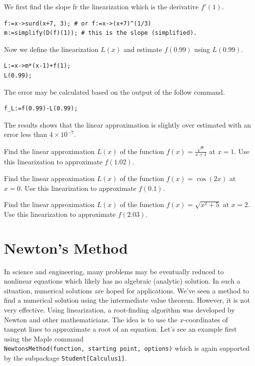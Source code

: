 \documentclass[]{book}
\theoremstyle{definition}
\theoremstyle{definition}
\theoremstyle{definition}
\theoremstyle{remark}
\let\BeginKnitrBlock\begin \let\EndKnitrBlock\end
\begin{document}
\BeginKnitrBlock{solution}
{}
We first find the slope fr the linearization which is the derivative \(f'(1)\).

\begin{verbatim}
f:=x->surd(x+7, 3); # or f:=x->(x+7)^(1/3)
m:=simplify(D(f)(1)); # this is the slope (simplified).
\end{verbatim}

Now we define the linearization \(L(x)\) and estimate \(f(0.99)\) using \(L(0.99)\).

\begin{verbatim}
L:=x->m*(x-1)+f(1);
L(0.99);
\end{verbatim}

The error may be calculated based on the output of the follow command.

\begin{verbatim}
f_L:=f(0.99)-L(0.99);
\end{verbatim}

The results shows that the linear approximation is slightly over estimated with an error less than \(4\times 10^{-7}\).
\EndKnitrBlock{solution}

\BeginKnitrBlock{exercise}
\protect\hypertarget{exr:unnamed-chunk-78}{}{\label{exr:unnamed-chunk-78} }
Find the linear approximation \(L(x)\) of the function \(f(x) = \frac{\sqrt{x}}{x+1}\) at \(x = 1\). Use this linearization to approximate \(f(1.02)\).
\EndKnitrBlock{exercise}

\BeginKnitrBlock{exercise}
\protect\hypertarget{exr:unnamed-chunk-79}{}{\label{exr:unnamed-chunk-79} }
Find the linear approximation \(L(x)\) of the function \(f(x) = \cos(2x)\) at \(x = 0\). Use this linearization to approximate \(f(0.1)\).
\EndKnitrBlock{exercise}

\BeginKnitrBlock{exercise}
\protect\hypertarget{exr:unnamed-chunk-80}{}{\label{exr:unnamed-chunk-80} }
Find the linear approximation \(L(x)\) of the function \(f(x) = \sqrt{x^2+5}\) at \(x = 2\). Use this linearization to approximate \(f(2.03)\).
\EndKnitrBlock{exercise}

\hypertarget{newtons-method}{%
\section{Newton's Method}\label{newtons-method}}

In science and engineering, many problems may be eventually reduced to nonlinear equations which likely has no algebraic (analytic) solution. In such a situation, numerical solutions are hoped for applications. We've seen a method to find a numerical solution using the intermediate value theorem. However, it is not very effective. Using linearization, a root-finding algorithm was developed by Newton and other mathematicians. The idea is to use the \(x\)-coordinates of tangent lines to approximate a root of an equation. Let's see an example first using the Maple command \texttt{NewtonsMethod(function,\ starting\ point,\ options)} which is again supported by the subpackage \texttt{Student{[}Calculus1{]}}.
\end{document}
